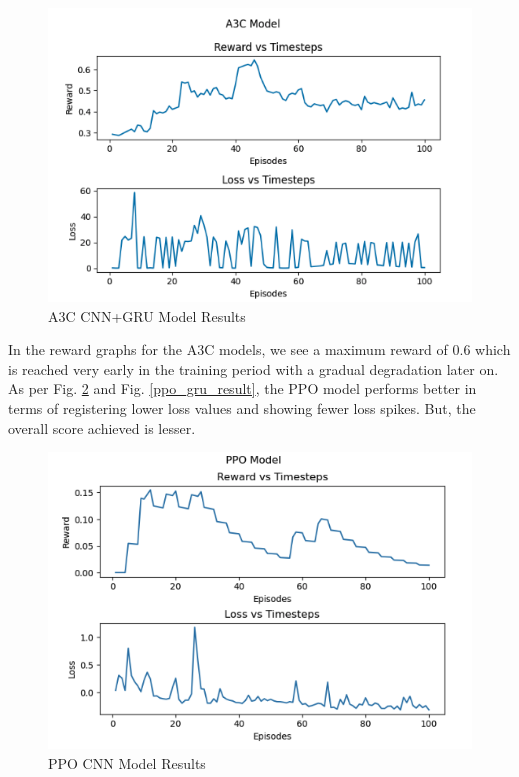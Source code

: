 \documentclass[conference]{IEEEtran}
\begin{document}
\begin{figure}[h!]
    \centering
    \includegraphics[width=\linewidth]{a3c_gru_result.png}
    \caption{A3C CNN+GRU Model Results}
    \label{a3c_gru_result}
\end{figure}

In the reward graphs for the A3C models, we see a maximum reward of 0.6 which is reached very early in the training period with a gradual degradation later on. As per Fig. \ref{ppo_cnn_result} and Fig. \ref{ppo_gru_result}, the PPO model performs better in terms of registering lower loss values and showing fewer loss spikes. But, the overall score achieved is lesser.

\begin{figure}[h!]
    \centering
    \includegraphics[width=\linewidth]{ppo_cnn_results.png}
    \caption{PPO CNN Model Results}
    \label{ppo_cnn_result}
\end{figure}
\end{document}
